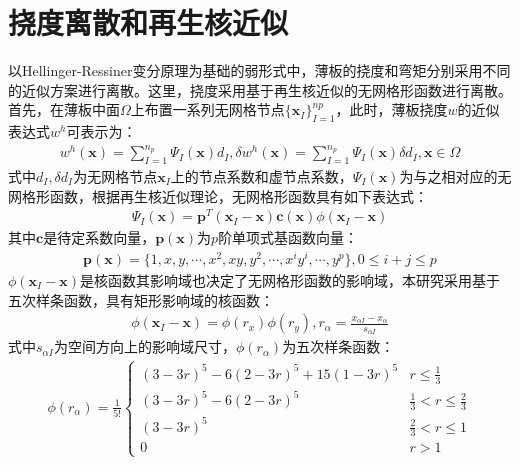 \documentclass[a4paper]{article}
\begin{document}
\section{挠度离散和再生核近似}
以Hellinger-Ressiner变分原理为基础的弱形式中，薄板的挠度和弯矩分别采用不同的近似方案进行离散。这里，挠度采用基于再生核近似的无网格形函数进行离散。首先，在薄板中面$\Omega$上布置一系列无网格节点$\{\pmb{x}_I\}_{I=1}^{np}$，此时，薄板挠度$w$的近似表达式$w^h$可表示为：
\begin{equation}
\begin{split}
    w^h(\pmb{x})=\sum_{I=1}^{n_p}\Psi_I(\pmb{x})d_I,\delta w^h(\pmb{x})=\sum_{I=1}^{n_p}\Psi_I(\pmb{x})\delta d_I,\pmb{x}\in\Omega
\end{split}
\end{equation}
式中$d_{I},\delta d_I$为无网格节点$\pmb{x}_I$上的节点系数和虚节点系数，$\Psi_I(\pmb{x})$为与之相对应的无网格形函数，根据再生核近似理论，无网格形函数具有如下表达式：
\begin{equation}
\begin{split}
    \Psi_I(\pmb{x})=\pmb{p}^T(\pmb{x}_I-\pmb{x})\pmb{c}(\pmb{x})\phi(\pmb{x}_I-\pmb{x})
\end{split}
\end{equation}
其中$\pmb{c}$是待定系数向量，$\pmb{p}(\pmb{x})$为$p$阶单项式基函数向量：
\begin{equation}
\begin{split}
    \pmb{p}(\pmb{x})=\{1,x,y,\dotsb ,x^2,xy,y^2,\dotsb,x^iy^i,\dotsb,y^p\},0\le i+j\le p
\end{split}
\end{equation}
$\phi(\pmb{x}_I-\pmb{x})$是核函数其影响域也决定了无网格形函数的影响域，本研究采用基于五次样条函数，具有矩形影响域的核函数：
\begin{equation}
\begin{split}
    \phi(\pmb{x}_I-\pmb{x})=\phi(r_x)\phi(r_y),r_{\alpha}=\frac{x_{\alpha I}-x_{\alpha}}{s_{\alpha I}}
\end{split}
\end{equation}
式中$s_{\alpha I}$为空间方向上的影响域尺寸，$\phi (r_{\alpha})$为五次样条函数：
\begin{equation}
\begin{split}
    \phi(r_{\alpha})=\frac{1}{5!}\begin{cases}
        (3-3r)^5-6(2-3r)^5+15(1-3r)^5&r\le\frac{1}{3}\\
        (3-3r)^5-6(2-3r)^5&\frac{1}{3}<r\le\frac{2}{3}\\
        (3-3r)^5&\frac{2}{3}<r\le1\\
        0&r>1
    \end{cases}
\end{split}
\end{equation}\par
\end{document}
